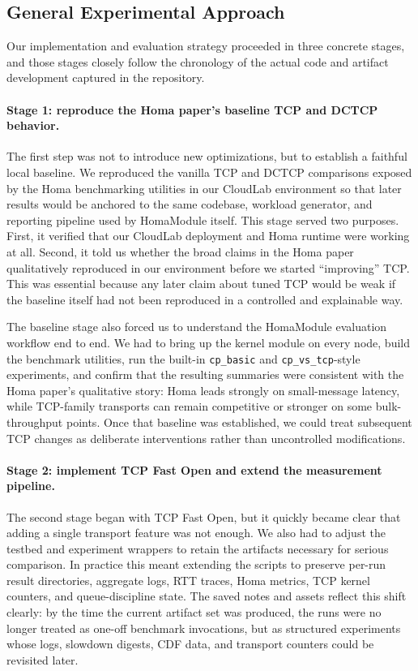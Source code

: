 \documentclass[11pt]{article}
\begin{document}
\subsection{General Experimental Approach}

Our implementation and evaluation strategy proceeded in three concrete stages, and those stages closely follow the chronology of the actual code and artifact development captured in the repository.

\paragraph{Stage 1: reproduce the Homa paper's baseline TCP and DCTCP behavior.}
The first step was not to introduce new optimizations, but to establish a faithful local baseline. We reproduced the vanilla TCP and DCTCP comparisons exposed by the Homa benchmarking utilities in our CloudLab environment so that later results would be anchored to the same codebase, workload generator, and reporting pipeline used by HomaModule itself. This stage served two purposes. First, it verified that our CloudLab deployment and Homa runtime were working at all. Second, it told us whether the broad claims in the Homa paper qualitatively reproduced in our environment before we started ``improving'' TCP. This was essential because any later claim about tuned TCP would be weak if the baseline itself had not been reproduced in a controlled and explainable way.

The baseline stage also forced us to understand the HomaModule evaluation workflow end to end. We had to bring up the kernel module on every node, build the benchmark utilities, run the built-in \texttt{cp\_basic} and \texttt{cp\_vs\_tcp}-style experiments, and confirm that the resulting summaries were consistent with the Homa paper's qualitative story: Homa leads strongly on small-message latency, while TCP-family transports can remain competitive or stronger on some bulk-throughput points. Once that baseline was established, we could treat subsequent TCP changes as deliberate interventions rather than uncontrolled modifications.

\paragraph{Stage 2: implement TCP Fast Open and extend the measurement pipeline.}
The second stage began with TCP Fast Open, but it quickly became clear that adding a single transport feature was not enough. We also had to adjust the testbed and experiment wrappers to retain the artifacts necessary for serious comparison. In practice this meant extending the scripts to preserve per-run result directories, aggregate logs, RTT traces, Homa metrics, TCP kernel counters, and queue-discipline state. The saved notes and assets reflect this shift clearly: by the time the current artifact set was produced, the runs were no longer treated as one-off benchmark invocations, but as structured experiments whose logs, slowdown digests, CDF data, and transport counters could be revisited later.
\end{document}
